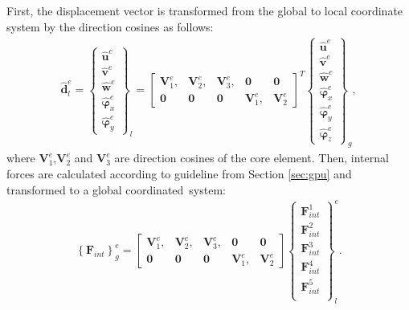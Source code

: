 \documentclass[11pt,a4paper,final]{report}
\begin{document}
First, the displacement vector is transformed from the global to local coordinate system by the direction cosines as follows:
\begin{eqnarray}
	\widehat{\textbf{d}}^e_l = \left \{\begin{array}{c}
		\widehat{\textbf{u}}^e \\ \widehat{\textbf{v}}^e \\
		\widehat{\textbf{w}}^e \\ \widehat{\boldsymbol{\varphi}}_x^e \\
		\widehat{\boldsymbol{\varphi}}_y^e
	\end{array}\right \}_l = 
	\left [\begin{array}{ccccc}
		\textbf{V}^e_1, & \textbf{V}^e_2, & \textbf{V}^e_3, & \textbf{0} & \textbf{0} \\
		\textbf{0} & \textbf{0} & \textbf{0} & \textbf{V}^e_1, & \textbf{V}^e_2
	\end{array}\right ]^T
	\left \{\begin{array}{c}
		\widehat{\textbf{u}}^e \\ \widehat{\textbf{v}}^e \\
		\widehat{\textbf{w}}^e \\ \widehat{\boldsymbol{\varphi}}_x^e \\
		\widehat{\boldsymbol{\varphi}}_y^e\\
		\widehat{\boldsymbol{\varphi}}_z^e
	\end{array}\right \}_g,
	\label{eq:d_local}
\end{eqnarray}
where \(\textbf{V}^e_1\),\(\textbf{V}^e_2\) and \(\textbf{V}^e_3\) are direction cosines of the core element. Then, internal forces are calculated according to guideline from Section \ref{sec:gpu} and transformed to a global coordinated~system:
\begin{eqnarray}
	\left\{\textbf{F}_{int}\right\}^e_g =
	\left [\begin{array}{ccccc}
		\textbf{V}^e_1, & \textbf{V}^e_2, & \textbf{V}^e_3, & \textbf{0} & \textbf{0} \\
		\textbf{0} & \textbf{0} & \textbf{0} & \textbf{V}^e_1, & \textbf{V}^e_2
	\end{array}\right ]
	\left \{\begin{array}{c}
		\textbf{F}^1_{int} \\
		\textbf{F}^2_{int} \\
		\textbf{F}^3_{int} \\
		\textbf{F}^4_{int} \\
		\textbf{F}^5_{int} \\
	\end{array}\right \}_l^e.
	\label{eq:f_global}
\end{eqnarray}
\end{document}

